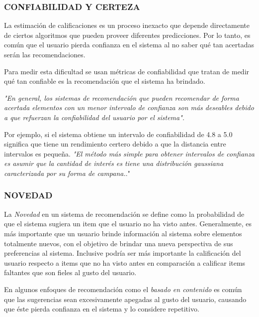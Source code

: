     \subsubsection{CONFIABILIDAD Y CERTEZA }

    La estimación de calificaciones es un proceso inexacto que depende directamente de ciertos algoritmos que pueden proveer diferentes predicciones. Por lo tanto, es común que el usuario pierda confianza en el sistema al no saber qué tan acertadas serán las recomendaciones.

    Para medir esta dificultad se usan métricas de confiabilidad que tratan de medir qué tan confiable es la recomendación que el sistema ha brindado.

    \textit{"En general, los sistemas de recomendación que pueden recomendar de forma acertada elementos con un menor intervalo de confianza son más deseables debido a que refuerzan la confiabilidad del usuario por el sistema".} \parencite{Aggarwal2016}

    Por ejemplo, si el sistema obtiene un intervalo de confiabilidad de 4.8 a 5.0 significa que tiene un rendimiento certero debido a que la distancia entre intervalos es pequeña. \textit{"El método más simple para obtener intervalos de confianza es asumir que la cantidad de interés es tiene una distribución gaussiana  caracterizada por su forma de campana.}." \parencite{10.5555/1941884}

    \newpage
    \thispagestyle{plain}
    \vspace*{0.2cm}

    \subsubsection{NOVEDAD}

    La \textit{Novedad} en un sistema de recomendación se define como la probabilidad de que el sistema sugiera un item que el usuario no ha visto antes.
    Generalmente, es más importante que un usuario brinde información al sistema sobre elementos totalmente nuevos, con el objetivo de brindar una nueva perspectiva de sus preferencias al sistema. Inclusive podría ser más importante la calificación del usuario respecto a items que no ha visto antes en comparación a calificar items faltantes que son fieles al gusto del usuario. 

    En algunos enfoques de recomendación como el \textit{basado en contenido} es común que las sugerencias sean excesivamente apegadas al gusto del usuario, causando que éste pierda confianza en el sistema y lo considere repetitivo.

